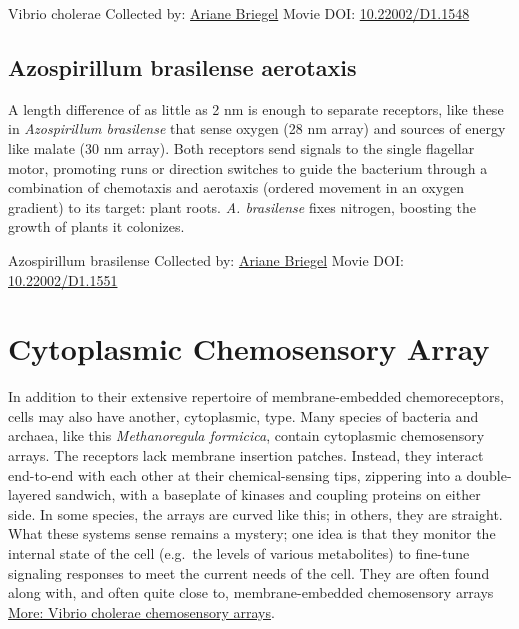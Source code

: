 \documentclass[]{tufte-book}
\begin{document}
\hypertarget{htmlwidget-54f79090f8462da74ba8}{}

\label{fig:7-4}Vibrio cholerae Collected by: \protect\hyperlink{ariane_briegel}{Ariane Briegel} Movie DOI: \href{https://doi.org/10.22002/D1.1548}{10.22002/D1.1548}

\hypertarget{Azospirillum_brasilense_aerotaxis}{%
\subsection{Azospirillum brasilense aerotaxis}\label{Azospirillum_brasilense_aerotaxis}}

A length difference of as little as 2 nm is enough to separate receptors, like these in \emph{Azospirillum brasilense} that sense oxygen (28 nm array) and sources of energy like malate (30 nm array). Both receptors send signals to the single flagellar motor, promoting runs or direction switches to guide the bacterium through a combination of chemotaxis and aerotaxis (ordered movement in an oxygen gradient) to its target: plant roots. \emph{A. brasilense} fixes nitrogen, boosting the growth of plants it colonizes.



\hypertarget{htmlwidget-e027985cf39abe50ba96}{}

\label{fig:7-4a}Azospirillum brasilense Collected by: \protect\hyperlink{ariane_briegel}{Ariane Briegel} Movie DOI: \href{https://doi.org/10.22002/D1.1551}{10.22002/D1.1551}

\hypertarget{cytoplasmic-chemosensory-array}{%
\section{Cytoplasmic Chemosensory Array}\label{cytoplasmic-chemosensory-array}}

In addition to their extensive repertoire of membrane-embedded chemoreceptors, cells may also have another, cytoplasmic, type. Many species of bacteria and archaea, like this \emph{Methanoregula formicica}, contain cytoplasmic chemosensory arrays. The receptors lack membrane insertion patches. Instead, they interact end-to-end with each other at their chemical-sensing tips, zippering into a double-layered sandwich, with a baseplate of kinases and coupling proteins on either side. In some species, the arrays are curved like this; in others, they are straight. What these systems sense remains a mystery; one idea is that they monitor the internal state of the cell (e.g.~the levels of various metabolites) to fine-tune signaling responses to meet the current needs of the cell. They are often found along with, and often quite close to, membrane-embedded chemosensory arrays \protect\hyperlink{Vibrio_cholerae_chemosensory_arrays}{More: Vibrio cholerae chemosensory arrays}.
\end{document}
